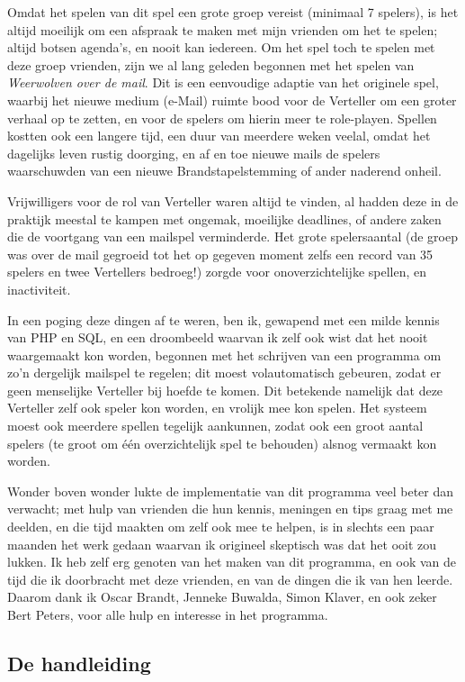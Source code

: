 \documentclass[12pt]{article}
\begin{document}
    Omdat het spelen van dit spel een grote groep vereist (minimaal 7 spelers), is het altijd moeilijk om een afspraak te maken met mijn vrienden om het te spelen; altijd botsen agenda's, en nooit kan iedereen. Om het spel toch te spelen met deze groep vrienden, zijn we al lang geleden begonnen met het spelen van \emph{Weerwolven over de mail}. Dit is een eenvoudige adaptie van het originele spel, waarbij het nieuwe medium (e-Mail) ruimte bood voor de Verteller om een groter verhaal op te zetten, en voor de spelers om hierin meer te role-playen. Spellen kostten ook een langere tijd, een duur van meerdere weken veelal, omdat het dagelijks leven rustig doorging, en af en toe nieuwe mails de spelers waarschuwden van een nieuwe Brandstapelstemming of ander naderend onheil.

    Vrijwilligers voor de rol van Verteller waren altijd te vinden, al hadden deze in de praktijk meestal te kampen met ongemak, moeilijke deadlines, of andere zaken die de voortgang van een mailspel verminderde. Het grote spelersaantal (de groep was over de mail gegroeid tot het op gegeven moment zelfs een record van 35 spelers en twee Vertellers bedroeg!) zorgde voor onoverzichtelijke spellen, en inactiviteit.

    In een poging deze dingen af te weren, ben ik, gewapend met een milde kennis van PHP en SQL, en een droombeeld waarvan ik zelf ook wist dat het nooit waargemaakt kon worden, begonnen met het schrijven van een programma om zo'n dergelijk mailspel te regelen; dit moest volautomatisch gebeuren, zodat er geen menselijke Verteller bij hoefde te komen. Dit betekende namelijk dat deze Verteller zelf ook speler kon worden, en vrolijk mee kon spelen. Het systeem moest ook meerdere spellen tegelijk aankunnen, zodat ook een groot aantal spelers (te groot om \'e\'en overzichtelijk spel te behouden) alsnog vermaakt kon worden. 

    Wonder boven wonder lukte de implementatie van dit programma veel beter dan verwacht; met hulp van vrienden die hun kennis, meningen en tips graag met me deelden, en die tijd maakten om zelf ook mee te helpen, is in slechts een paar maanden het werk gedaan waarvan ik origineel skeptisch was dat het ooit zou lukken. Ik heb zelf erg genoten van het maken van dit programma, en ook van de tijd die ik doorbracht met deze vrienden, en van de dingen die ik van hen leerde. Daarom dank ik Oscar Brandt, Jenneke Buwalda, Simon Klaver, en ook zeker Bert Peters, voor alle hulp en interesse in het programma.

  \subsection{De handleiding}
\end{document}
